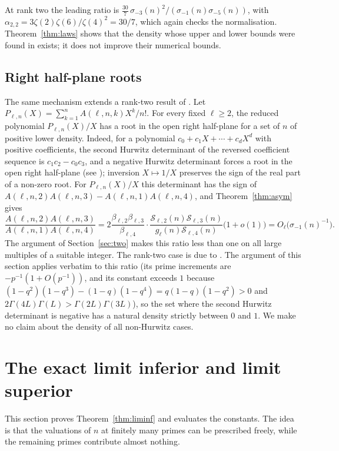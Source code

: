 \documentclass[11pt,a4paper]{article}
\theoremstyle{remark}
\numberwithin{equation}{section}
\newcommand{\Sing}{\mathcal S}
\begin{document}
At rank two the leading ratio is $\frac{30}7\,\sigma_{-3}(n)^2/(\sigma_{-1}(n)\sigma_{-5}(n))$, with $\alpha_{2,2}=3\zeta(2)\zeta(6)/\zeta(4)^2=30/7$, which again checks the normalisation. Theorem~\ref{thm:laws} shows that the density whose upper and lower bounds were found in \cite{CHS2026} exists; it does not improve their numerical bounds.

\subsection{Right half-plane roots}
The same mechanism extends a rank-two result of \cite{CHNST2026}. Let $P_{\ell,n}(X)=\sum_{k=1}^nA(\ell,n,k)X^k/n!$. For every fixed $\ell\ge2$, the reduced polynomial $P_{\ell,n}(X)/X$ has a root in the open right half-plane for a set of $n$ of positive lower density. Indeed, for a polynomial $c_0+c_1X+\cdots+c_dX^d$ with positive coefficients, the second Hurwitz determinant of the reversed coefficient sequence is $c_1c_2-c_0c_3$, and a negative Hurwitz determinant forces a root in the open right half-plane (see \cite[Section~2.1]{CHNST2026}); inversion $X\mapsto1/X$ preserves the sign of the real part of a non-zero root. For $P_{\ell,n}(X)/X$ this determinant has the sign of $A(\ell,n,2)A(\ell,n,3)-A(\ell,n,1)A(\ell,n,4)$, and Theorem~\ref{thm:asym} gives
\[
\frac{A(\ell,n,2)A(\ell,n,3)}{A(\ell,n,1)A(\ell,n,4)}=2\frac{\beta_{\ell,2}\beta_{\ell,3}}{\beta_{\ell,4}}\cdot\frac{\Sing_{\ell,2}(n)\Sing_{\ell,3}(n)}{g_\ell(n)\Sing_{\ell,4}(n)}\bigl(1+o(1)\bigr)=O_\ell\bigl(\sigma_{-1}(n)^{-1}\bigr).
\]
The argument of Section~\ref{sec:two} makes this ratio less than one on all large multiples of a suitable integer. The rank-two case is due to \cite{CHNST2026}. The argument of this section applies verbatim to this ratio (its prime increments are $-p^{-1}(1+O(p^{-1}))$, and its constant exceeds $1$ because $(1-q^2)(1-q^3)-(1-q)(1-q^4)=q(1-q)(1-q^2)>0$ and $2\Gamma(4L)\Gamma(L)>\Gamma(2L)\Gamma(3L)$), so the set where the second Hurwitz determinant is negative has a natural density strictly between $0$ and $1$. We make no claim about the density of all non-Hurwitz cases.

\section{The exact limit inferior and limit superior}\label{sec:liminf}

This section proves Theorem~\ref{thm:liminf} and evaluates the constants. The idea is that the valuations of $n$ at finitely many primes can be prescribed freely, while the remaining primes contribute almost nothing.
\end{document}
